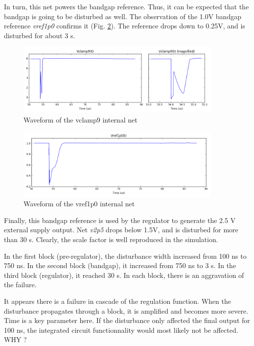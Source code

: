 In turn, this net powers the bandgap reference.
Thus, it can be expected that the bandgap is going to be disturbed as well.
The observation of the 1.0V bandgap reference \textit{vref1p0} confirms it (Fig. \ref{fig:wvf-v1p0}).
The reference drops down to 0.25V, and is disturbed for about 3 \textmugreek{}s.

\begin{figure}[!htbp]
  \centering
  \includegraphics[width=0.9\textwidth]{src/3/figures/vclamp9.png}
  \caption{Waveform of the vclamp9 internal net}
  \label{fig:wvf-vclamp9}
\end{figure}

\begin{figure}[!htbp]
  \centering
  \includegraphics[width=0.9\textwidth]{src/3/figures/v1p0.png}
  \caption{Waveform of the vref1p0 internal net}
  \label{fig:wvf-v1p0}
\end{figure}

Finally, this bandgap reference is used by the regulator to generate the 2.5 V external supply output.
Net \textit{v2p5} drops below 1.5V, and is disturbed for more than 30 \textmugreek{}s.
Clearly, the scale factor is well reproduced in the simulation.

In the first block (pre-regulator), the disturbance width increased from 100 ns to 750 ns.
In the second block (bandgap), it increased from 750 ns to 3 \textmugreek{}s.
In the third block (regulator), it reached 30 \textmugreek{}s.
In each block, there is an aggravation of the failure.

It appears there is a failure in cascade of the regulation function.
When the disturbance propagates through a block, it is amplified and becomes more severe.
Time is a key parameter here.
If the disturbance only affected the final output for 100 ns, the integrated circuit functionnality would most likely not be affected.
WHY ?

